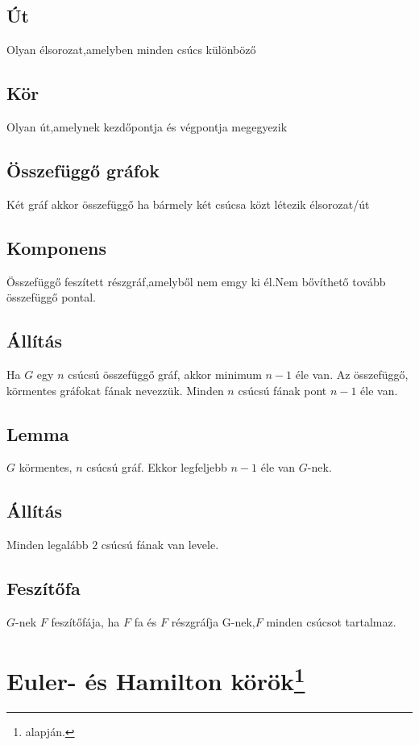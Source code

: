 \documentclass[12pt,a4paper,twoside]{report}
\begin{document}
\subsection{Út}
Olyan élsorozat,amelyben minden csúcs különböző
\subsection{Kör}
Olyan út,amelynek kezdőpontja és végpontja megegyezik
\subsection{Összefüggő gráfok}
Két gráf akkor összefüggő ha bármely két csúcsa közt létezik élsorozat/út
\subsection{Komponens}
Összefüggő feszített részgráf,amelyből nem emgy ki él.Nem bővíthető tovább összefüggő pontal.
\subsection{Állítás}
Ha $G$ egy $n$ csúcsú összefüggő gráf, akkor minimum $n-1$ éle van.
\df
Az összefüggő, körmentes gráfokat fának nevezzük.
\al
Minden $n$ csúcsú fának pont $n-1$ éle van.
\subsection{Lemma}
$G$ körmentes, $n$ csúcsú gráf. Ekkor legfeljebb $n-1$ éle van $G$-nek.
\subsection{Állítás}
Minden legalább $2$ csúcsú fának van levele.
\subsection{Feszítőfa}
$G$-nek $F$ feszítőfája, ha $F$ fa és $F$ részgráfja G-nek,$F$ minden csúcsot tartalmaz.
\section{Euler- és Hamilton körök\protect\footnote{\cite{kv} alapján.}}
\end{document}
